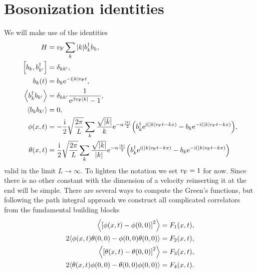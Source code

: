 \documentclass[english, parskip=full]{scrartcl}
\title{\titel}
\author{\autor}
\date{\today}
\begin{document}
\maketitle  %


\section{Bosonization identities}
We will make use of the identities
\begin{align}
H &= \vf \sum_k |k| b_k^\dagger b_k,\\
\klb*{b_k, b_{k'}^\dagger} &= \delta_{kk'},\\
b_k(t) &= b_k\powe{-\i |k|\vf t},\\
\bra*{b_k^\dagger b_{k'}} &= \delta_{kk'} \frac{1}{\powe{\beta \vf |k|} - 1},\\
\bra*{b_k b_{k'}} &= 0,\\
\phi(x,t) &= -\frac{\i}{2} \sqrt{\frac{2\pi}{L}} \sum_k \frac{\sqrt{|k|}}{k} \powe{-\alpha \frac{|k|}{2}} \kla*{b_k^\dagger \powe{\i (|k|\vf t - kx)} - b_k \powe{-\i (|k|\vf t - kx)}},\\
\theta(x,t) &= \frac{\i}{2} \sqrt{\frac{2\pi}{L}} \sum_k \frac{\sqrt{|k|}}{|k|} \powe{-\alpha \frac{|k|}{2}} \kla*{b_k^\dagger \powe{\i (|k|\vf t - kx)} - b_k \powe{-\i (|k|\vf t - kx)}}
\end{align}
valid in the limit $L\rightarrow \infty$.
To lighten the notation we set $v_{\text{F}} = 1$ for now.
Since there is no other constant with the dimension of a velocity reinserting it at the end will be simple.
There are several ways to compute the Green's functions, but following the path integral approach we construct all complicated correlators from the fundamental building blocks
\begin{align}
\bra*{\klb*{\phi(x,t) - \phi(0,0)}^2} &= F_1(x,t),\\
2\bra*{\phi(x,t)\theta(0,0) - \phi(0,0)\theta(0,0)} &= F_2(x,t),\\
\bra*{\klb*{\theta(x,t) - \theta(0,0)}^2} &= F_3(x,t),\\
2\bra*{\theta(x,t)\phi(0,0) - \theta(0,0)\phi(0,0)} &= F_4(x,t).
\end{align}
\end{document}

